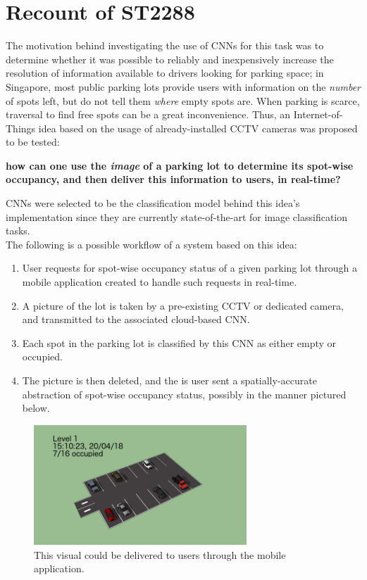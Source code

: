 \documentclass[a4paper, 11pt]{article} %
\begin{document}
\section{Recount of ST2288}
	The motivation behind investigating the use of CNNs for this task was to 
	determine whether it was 
	possible to reliably and inexpensively increase the resolution of information available to drivers 
	looking for parking space; in Singapore, most public parking lots provide 
	users with information on the \textit{number} of 
	spots left, but do not tell them \textit{where} empty spots are. When 
	parking is scarce, traversal to find free spots 
	can be a great inconvenience. Thus, an Internet-of-Things idea based on the usage of 
	already-installed CCTV cameras was proposed to be tested:
	\begin{center}
		\textbf{
			how can one use the \textit{image} of a parking lot to determine its spot-wise occupancy, and 
			then deliver this information to users, in real-time?}
	\end{center}
	CNNs were selected to be the classification model behind this idea's implementation since they are 
	currently state-of-the-art for image classification tasks.\\
	The following is a possible workflow of a system based on this idea: 
	\begin{enumerate}
		\item User requests for spot-wise occupancy status of a given parking lot through a mobile 
		application created to handle such requests in real-time.
		\item A picture of the lot is taken by a pre-existing CCTV or dedicated camera, and transmitted to 
		the associated cloud-based CNN.
		\item Each spot in the parking lot is classified by this CNN as either empty or occupied.
		\item The picture is then deleted, and the is user sent a spatially-accurate abstraction of 
		spot-wise occupancy status, possibly in the manner pictured below.
	\end{enumerate}
	\begin{figure}[H]
		\centering
		\includegraphics[width=8cm]{figures/mock-up.jpg}
		\caption{This visual could be delivered to users through the mobile application.}
	\end{figure}
\end{document}
